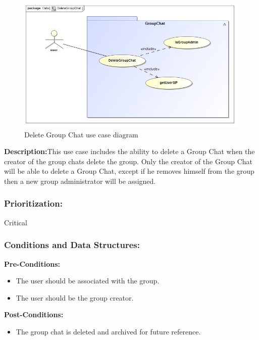 \documentclass[a4paper]{article}
\begin{document}
\begin{figure}[H]
\includegraphics[width=1\linewidth]{./pictures/deleteGroupChat.jpg}
\caption{Delete Group Chat use case diagram}
\end{figure} 

\textbf{Description:}This use case includes the ability to delete a Group Chat when the creator of the group chats delete the group. Only the creator of the Group Chat will be able to delete a Group Chat, except if he removes himself from the group then a new group administrator will be assigned.

\subsubsection{Prioritization:} Critical

\subsubsection{Conditions and Data Structures:}
\textbf{Pre-Conditions:}
\begin{itemize}
	\item The user should be associated with the group. 
	\item The user should be the group creator. 
\end{itemize}
\textbf{Post-Conditions:}
\begin{itemize}
	\item The group chat is deleted and archived for future reference. 
\end{itemize}
\end{document}
